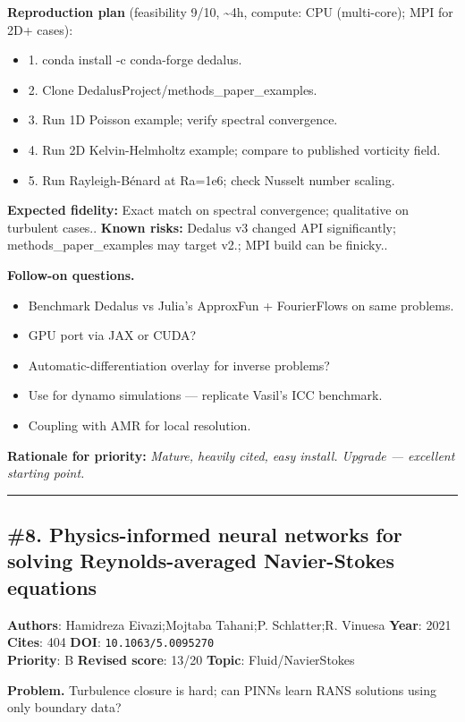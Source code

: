 \documentclass[10pt,letterpaper]{article}
\begin{document}
\textbf{Reproduction plan} (feasibility 9/10, \textasciitilde4h, compute: CPU (multi-core); MPI for 2D+ cases):
\begin{itemize}
\item 1. conda install -c conda-forge dedalus.
\item 2. Clone DedalusProject/methods\_paper\_examples.
\item 3. Run 1D Poisson example; verify spectral convergence.
\item 4. Run 2D Kelvin-Helmholtz example; compare to published vorticity field.
\item 5. Run Rayleigh-Bénard at Ra=1e6; check Nusselt number scaling.
\end{itemize}
\textbf{Expected fidelity:} Exact match on spectral convergence; qualitative on turbulent cases.. \textbf{Known risks:} Dedalus v3 changed API significantly; methods\_paper\_examples may target v2.; MPI build can be finicky..

\textbf{Follow-on questions.}
\begin{itemize}
\item Benchmark Dedalus vs Julia's ApproxFun + FourierFlows on same problems.
\item GPU port via JAX or CUDA?
\item Automatic-differentiation overlay for inverse problems?
\item Use for dynamo simulations — replicate Vasil's ICC benchmark.
\item Coupling with AMR for local resolution.
\end{itemize}

\textbf{Rationale for priority:} \emph{Mature, heavily cited, easy install. Upgrade — excellent starting point.}

\medskip\hrule\medskip

\subsection*{\#8. Physics-informed neural networks for solving Reynolds-averaged Navier-Stokes equations}
\textbf{Authors}: Hamidreza Eivazi;Mojtaba Tahani;P. Schlatter;R. Vinuesa \textbullet{} \textbf{Year}: 2021 \textbullet{} \textbf{Cites}: 404 \textbullet{} \textbf{DOI}: \texttt{10.1063/5.0095270} \\
\textbf{Priority}: B \textbullet{} \textbf{Revised score}: 13/20 \textbullet{} \textbf{Topic}: Fluid/NavierStokes

\textbf{Problem.} Turbulence closure is hard; can PINNs learn RANS solutions using only boundary data?
\end{document}
